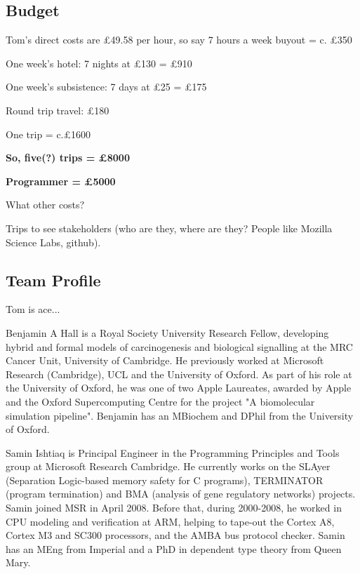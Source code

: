 \documentclass[a4paper,11pt]{article}
\begin{document}



\subsection*{Budget}

Tom's direct costs are \pounds 49.58 per hour, so say 7 hours a week
buyout = c. \pounds 350

One week's hotel: 7 nights at \pounds 130 = \pounds 910

One week's subsistence: 7 days at \pounds 25 = \pounds 175

Round trip travel: \pounds 180

One trip = c.£1600

{\textbf{So, five(?) trips = \pounds 8000}}

{\textbf{Programmer = \pounds 5000}}

What other costs?

Trips to see stakeholders (who are they, where are they? People like Mozilla Science Labs, github). 

\subsection*{Team Profile}


Tom is ace...

Benjamin A Hall is a Royal Society University Research Fellow, developing hybrid and formal models of carcinogenesis and biological signalling at the MRC Cancer Unit, University of Cambridge. He previously worked at Microsoft Research (Cambridge), UCL and the University of Oxford. As part of his role at the University of Oxford, he was one of two Apple Laureates, awarded by Apple and the Oxford Supercomputing Centre for the project "A biomolecular simulation pipeline". Benjamin has an MBiochem and DPhil from the University of Oxford.

Samin Ishtiaq is Principal Engineer in the Programming Principles and Tools group at Microsoft Research Cambridge. He currently works on the SLAyer (Separation Logic-based memory safety for C programs), TERMINATOR (program termination) and BMA (analysis of gene regulatory networks) projects. Samin joined MSR in April 2008. Before that, during 2000-2008, he worked in CPU modeling and verification at ARM, helping to tape-out the Cortex A8, Cortex M3 and SC300 processors, and the AMBA bus protocol checker. Samin has an MEng from Imperial and a PhD in dependent type theory from Queen Mary. 



\end{document}
